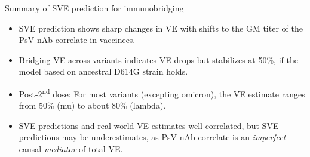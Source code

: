 \documentclass{beamer}
\begin{document}
\begin{frame}[c]{Summary of SVE prediction for immunobridging}

\begin{center}
\begin{itemize}
  \itemsep6pt
  \item SVE prediction shows sharp changes in VE with shifts to the GM titer of
    the PsV nAb correlate in vaccinees.
  \item Bridging VE across variants indicates VE drops but stabilizes at 50\%,
    if the model based on ancestral D614G strain holds.
  \item Post-2\textsuperscript{nd} dose: For most variants (excepting
    omicron), the VE estimate ranges from 50\% (mu) to about 80\% (lambda).
  \item SVE predictions and real-world VE estimates well-correlated, but
      SVE predictions may be underestimates, as PsV nAb correlate is an
      \textit{imperfect} causal \textit{mediator} of total VE.
\end{itemize}
\end{center}

\note{
}

\end{frame}

\end{document}
